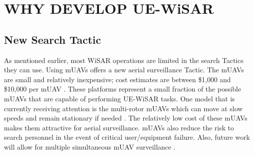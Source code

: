% 

\section{WHY DEVELOP UE-WiSAR}
\subsection{New Search Tactic}
As mentioned earlier, most WiSAR operations are limited in the search Tactics
they can use.  Using mUAVs offers a new aerial surveillance Tactic.  The mUAVs
are small and relatively inexpensive; cost estimates are between \$1,000 and
\$10,000 per mUAV
\cite{goodrich2008supporting,goodrich2007using,adams2007camera}.
These platforms represent a small fraction of the possible mUAVs that are capable of performing
UE-WiSAR tasks.  One model that is currently receiving attention is the
multi-rotor mUAVs which can move at slow speeds and remain stationary if needed
\cite{almurib2011control}.  The relatively low cost of these mUAVs makes them
attractive for aerial surveillance.  mUAVs also reduce the risk to search
personnel in the event of critical user/equipment failure.  Also, future work
will allow for multiple simultaneous mUAV surveillance 
\cite{waharte2009coordinated}.  

